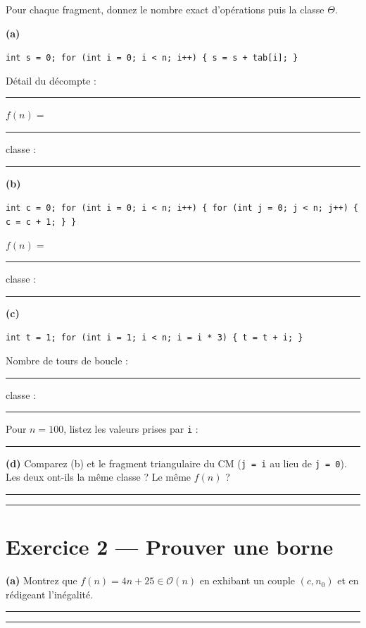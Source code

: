\documentclass[11pt,a4paper]{article}
\newcommand{\bigO}{\mathcal{O}}
\newcommand{\bigTheta}{\Theta}
\newcommand{\lig}[1]{\rule{#1}{0.4pt}}
\begin{document}
Pour chaque fragment, donnez le nombre exact d'opérations puis la classe
$\bigTheta$.

\vspace{0.3cm}
\noindent\textbf{(a)}
\begin{center}
\texttt{int s = 0; for (int i = 0; i < n; i++) \{ s = s + tab[i]; \}}
\end{center}

\noindent Détail du décompte : \lig{12cm}

\noindent $f(n) = $ \lig{5cm} \qquad classe : \lig{3cm}

\vspace{0.4cm}
\noindent\textbf{(b)}
\begin{center}
\texttt{int c = 0; for (int i = 0; i < n; i++) \{ for (int j = 0; j < n; j++) \{ c = c + 1; \} \}}
\end{center}

\noindent $f(n) = $ \lig{5cm} \qquad classe : \lig{3cm}

\vspace{0.4cm}
\noindent\textbf{(c)}
\begin{center}
\texttt{int t = 1; for (int i = 1; i < n; i = i * 3) \{ t = t + i; \}}
\end{center}

\noindent Nombre de tours de boucle : \lig{4cm} \qquad classe : \lig{3cm}

\vspace{0.3cm}
\noindent Pour $n = 100$, listez les valeurs prises par \texttt{i} :
\lig{8cm}

\vspace{0.4cm}
\noindent\textbf{(d)} Comparez (b) et le fragment triangulaire du CM
(\texttt{j = i} au lieu de \texttt{j = 0}). Les deux ont-ils la même classe ?
Le même $f(n)$ ? \lig{9cm}

\vspace{0.2cm}
\noindent\lig{14cm}

\section{Exercice 2 --- Prouver une borne}

\noindent\textbf{(a)} Montrez que $f(n) = 4n + 25 \in \bigO(n)$ en exhibant
un couple $(c, n_0)$ et en rédigeant l'inégalité.

\vspace{0.2cm}
\noindent\lig{14cm}

\vspace{0.2cm}
\noindent\lig{14cm}
\end{document}
